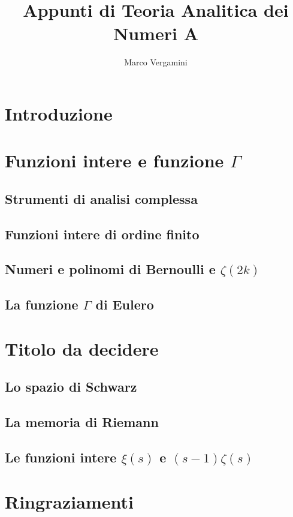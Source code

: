 \documentclass{article}
\title{Appunti di Teoria Analitica dei Numeri A}
\date{}
\author{Marco Vergamini}
\begin{document}
\maketitle
\newpage
\tableofcontents
\newpage


\section*{Introduzione}


\newpage

\section{Funzioni intere e funzione $\Gamma$}

\subsection{Strumenti di analisi complessa}


\subsection{Funzioni intere di ordine finito}


\subsection{Numeri e polinomi di Bernoulli e $\zeta(2k)$}


\subsection{La funzione $\Gamma$ di Eulero}


\newpage

\section{Titolo da decidere}

\subsection{Lo spazio di Schwarz}


\subsection{La memoria di Riemann}


\subsection{Le funzioni intere $\xi(s)$ e $(s-1)\zeta(s)$}


\newpage



\section*{Ringraziamenti}

\end{document}
